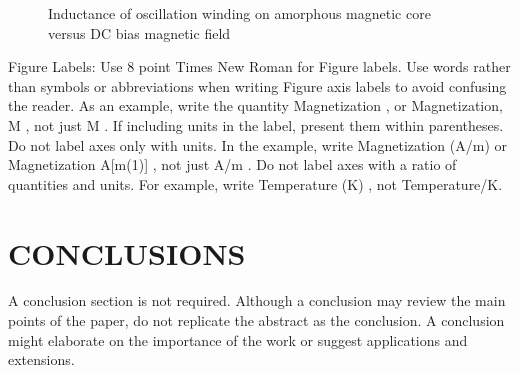 \documentclass[letterpaper, 10 pt, conference]{ieeeconf}  %
\begin{document}
   \begin{figure}[thpb]
      \centering
      \caption{Inductance of oscillation winding on amorphous
       magnetic core versus DC bias magnetic field}
      \label{figurelabel}
   \end{figure}
   

Figure Labels: Use 8 point Times New Roman for Figure labels. Use words rather than symbols or abbreviations when writing Figure axis labels to avoid confusing the reader. As an example, write the quantity  Magnetization , or  Magnetization, M , not just  M . If including units in the label, present them within parentheses. Do not label axes only with units. In the example, write  Magnetization (A/m)  or  Magnetization {A[m(1)]} , not just  A/m . Do not label axes with a ratio of quantities and units. For example, write  Temperature (K) , not  Temperature/K. 

\section{CONCLUSIONS}

A conclusion section is not required. Although a conclusion may review the main points of the paper, do not replicate the abstract as the conclusion. A conclusion might elaborate on the importance of the work or suggest applications and extensions. 

\addtolength{\textheight}{-12cm}   %




\end{document}
